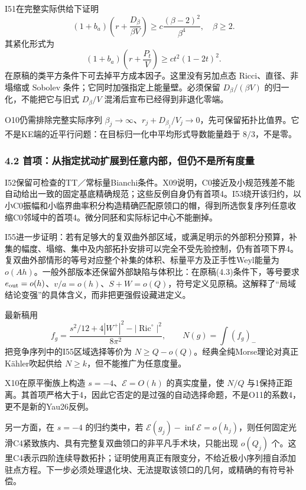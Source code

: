 \documentclass[
  10pt,
]{article}
\begin{document}
I51在完整实际供给下证明 \[
(1+b_a)\left(r+\frac{D_\beta}{\beta V}\right)
\ge c\frac{(\beta-2)^2}{\beta^4},\quad \beta\ge2.
\] 其紧化形式为 \[
(1+b_a)\left(r+\frac{P_t}{V}\right)
\ge ct^2(1-2t)^2.
\] 在原稿的类平方条件下可去掉平方成本因子。这里没有另加点态
Ricci、直径、非塌缩或 Sobolev 条件；它同时加强指定上能量壁。必须保留
\(D_\beta/(\beta V)\) 的归一化，不能把它与旧式 \(D_\beta/V\)
混淆后宣布已经得到非退化零端。

O10仍需排除完整实际序列
\(\beta_j\to\infty\)、\(r_j+D_{\beta_j}/V_j\to0\)，先可保留拓扑比值界。它不是KE端的近平行问题：在目标归一化中平均形式导数能量趋于
\(8/3\)，不是零。

\hypertarget{ux9996ux9879ux4eceux6307ux5b9aux6270ux52a8ux6269ux5c55ux5230ux4efbux610fux5185ux90e8ux4f46ux4ecdux4e0dux662fux6240ux6709ux5ea6ux91cf}{%
\subsubsection{4.2
首项：从指定扰动扩展到任意内部，但仍不是所有度量}\label{ux9996ux9879ux4eceux6307ux5b9aux6270ux52a8ux6269ux5c55ux5230ux4efbux610fux5185ux90e8ux4f46ux4ecdux4e0dux662fux6240ux6709ux5ea6ux91cf}}

I52保留可检查的TT／常标量Bianchi条件。X09说明，C0接近及小规范残差不能自动给出一致的固定基底精确规范；这些反例自身仍有首项4。I53绕开该归约，以小C0振幅和小临界曲率积分构造精确匹配原领口的帽，得到所选恢复序列任意收缩C0邻域中的首项4。微分同胚和实际标记中心不能删掉。

I55进一步证明：若有足够大的复双曲外部区域，或满足明示的外部积分预算，补集的幅度、塌缩、集中及内部拓扑安排可以完全不受先验控制，仍有首项下界4。复双曲外部情形的等号对应整个补集的体积、标量平方及正手性Weyl能量为
\(o(Ah)\)。一般外部版本还保留外部缺陷与体积比：在原稿(4.3)条件下，等号要求
\(e_{\rm out}=o(h)\)、\(v/a=o(h)\)、\(S+W=o(Q)\)，符号定义见原稿。这解释了``局域结论变强''的具体含义，而非把更强假设藏进定义。

最新稿用 \[
f_g=\frac{s^2/12+4|W^+|^2-|\operatorname{Ric}^{\circ}|^2}{8\pi^2},
\qquad N(g)=\int(f_g)_-
\] 把竞争序列中的I55区域选择等价为
\(N\ge Q-o(Q)\)。经典全纯Morse理论对真正Kähler吹起供给
\(N\ge k\)，但不能推广为任意度量。

X10在原平衡族上构造 \(s=-4\)、\(\mathcal E=O(h)\) 的真实度量，使 \(N/Q\)
与1保持正距离。其首项严格大于4，因此它否定的是过强的自动选择命题，不是O11的系数4，更不是新的Yau26反例。

另一方面，在 \(s=-4\) 的归约类中，若
\(\mathcal E(g_j)-\inf\mathcal E=o(h_j)\)，则任何固定光滑C4紧致族内、具有完整复双曲领口的非平凡手术块，只能出现
\(o(Q_j)\)
个。这里C4表示四阶连续导数拓扑；证明使用真正有限变分，不给近极小序列擅自添加驻点方程。下一步必须处理退化块、无法提取该领口的几何，或精确的有符号补偿。
\end{document}
